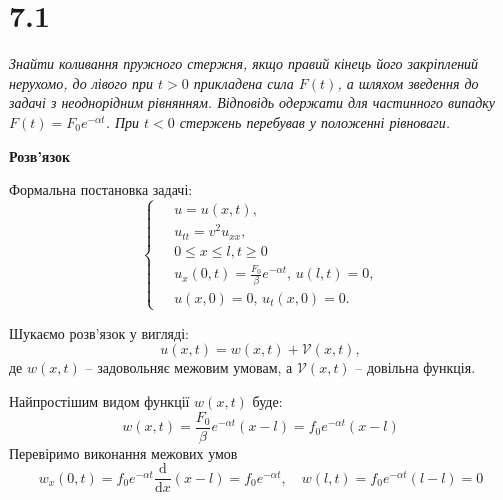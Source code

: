 

%



\section[Задача №7.1]{7.1}

\textit{Знайти коливання пружного стержня, якщо правий кінець його закріплений нерухомо, до лівого при $t > 0$ прикладена сила $F(t)$, а шляхом зведення до задачі з неоднорідним рівнянням. Відповідь одержати для частинного випадку $F(t) = F_0 e^{-\alpha t}$. При $t < 0$ стержень перебував у положенні рівноваги.} 

\begin{center}
    \large{\textbf{Розв'язок}}
\end{center}

\noindent Формальна постановка задачі:
\begin{equation} \label{cond7,1}
    \left\{ \begin{aligned}
            \;&u = u(x,t), \\
            &u_{tt} = v^2 u_{xx}, \\
            &0 \leq x \leq l, t \geq 0 \\
            &u_x(0,t) = \frac{F_0}{\beta} e^{-\alpha t}, \, u(l,t) = 0, \\
            &u(x,0) = 0, \, u_t(x,0) = 0.
    \end{aligned} \right.
\end{equation}

Шукаємо розв'язок у вигляді:
\begin{equation} \label{subst7,1}
    u(x,t) = w(x,t) + \mathcal{V}(x,t),
\end{equation}
де $w(x,t)$ -- задовольняє межовим умовам, а $\mathcal{V}(x,t)$ -- довільна функція.

Найпростішим видом функції $w(x,t)$ буде:
\begin{equation}
    w(x,t) = \frac{F_0}{\beta} e^{-\alpha t} (x - l) = f_0 e^{-\alpha t} (x - l)
\end{equation}
Перевіримо виконання межових умов
\begin{equation*}
    w_x(0,t) = f_0 e^{-\alpha t} \frac{\mathrm{d}}{\mathrm{d}x} (x - l) = f_0 e^{-\alpha t}, \quad w(l,t) = f_0 e^{-\alpha t} (l - l) = 0
\end{equation*}

